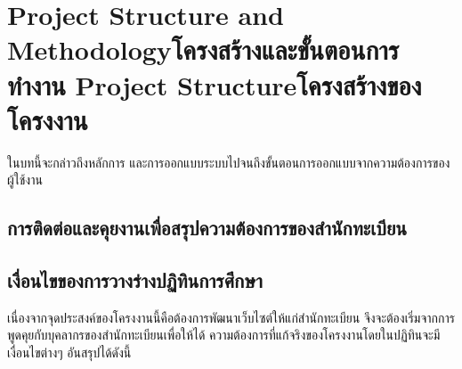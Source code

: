 \chapter{\ifproject%
\ifenglish Project Structure and Methodology\else โครงสร้างและขั้นตอนการทำงาน\fi
\else%
\ifenglish Project Structure\else โครงสร้างของโครงงาน\fi
\fi
}

ในบทนี้จะกล่าวถึงหลักการ และการออกแบบระบบไปจนถึงขั้นตอนการออกแบบจากความต้องการของผู้ใช้งาน

\makeatletter


\makeatother

\section{การติดต่อและคุยงานเพื่อสรุปความต้องการของสำนักทะเบียน}


\section{เงื่อนไขของการวางร่างปฏิทินการศึกษา}
  เนื่องจากจุดประสงค์ของโครงงานนี้คือต้องการพัฒนาเว็บไซต์ให้แก่สำนักทะเบียน
  จึงจะต้องเริ่มจากการพูดคุยกับบุคลากรของสำนักทะเบียนเพื่อให้ได้
  ความต้องการที่แก้จริงของโครงงานโดยในปฏิทินจะมีเงื่อนไขต่างๆ อันสรุปได้ดังนี้

